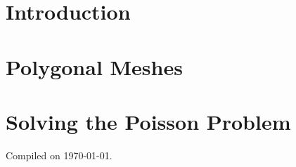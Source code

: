 \documentclass[10pt]{beamer}
\title{\presentationtitle}
\subtitle{Advanced Programming for Scientific Computing}
\author[Andrea Di Antonio]{Andrea Di Antonio \\ Supervised by Professors Paola F. Antonietti and Marco Verani} %
\date{Exam session of September 10, 2024 \\ Academic Year 2023-24}
\begin{document}
    \begin{frame}
        \titlepage
    \end{frame} %

    \section{Introduction}
    

	\section{Polygonal Meshes}
	

	\section{Solving the Poisson Problem}
	

	

	\begin{frame}
		\thispagestyle{empty}
		\begin{center}
			Compiled on \today.
		\end{center}
	\end{frame}
\end{document}
